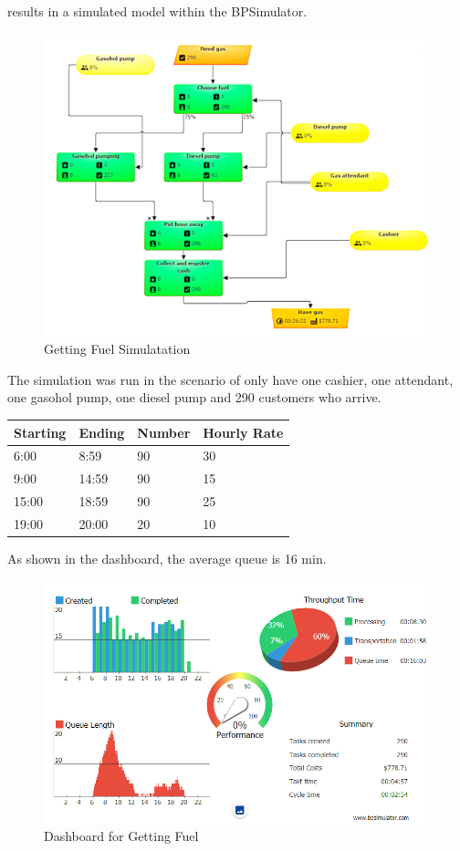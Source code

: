 \documentclass[]{book}
\begin{document}
results in a simulated model within the BPSimulator.

\begin{figure}
\centering
\includegraphics{images/gaspumpsim.png}
\caption{Getting Fuel Simulatation}
\end{figure}

The simulation was run in the scenario of only have one cashier, one attendant, one gasohol pump, one diesel pump and 290 customers who arrive.

\begin{longtable}[]{@{}llll@{}}
\toprule
Starting & Ending & Number & Hourly Rate\tabularnewline
\midrule
\endhead
6:00 & 8:59 & 90 & 30\tabularnewline
9:00 & 14:59 & 90 & 15\tabularnewline
15:00 & 18:59 & 90 & 25\tabularnewline
19:00 & 20:00 & 20 & 10\tabularnewline
\bottomrule
\end{longtable}

As shown in the dashboard, the average queue is 16 min.

\begin{figure}
\centering
\includegraphics{images/gaspumpdash.png}
\caption{Dashboard for Getting Fuel}
\end{figure}
\end{document}

